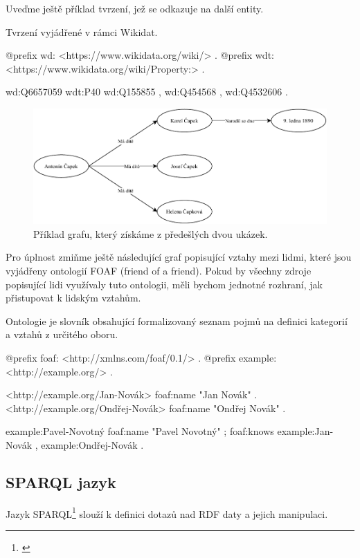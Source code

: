 Uveďme ještě příklad tvrzení, jež se odkazuje na další entity.
\begin{prikl}
Tvrzení  vyjádřené v rámci Wikidat.
\begin{code}
@prefix wd: <https://www.wikidata.org/wiki/> .
@prefix wdt: <https://www.wikidata.org/wiki/Property:> .

wd:Q6657059 wdt:P40 wd:Q155855 ,
                    wd:Q454568 ,
                    wd:Q4532606 .
\end{code}
\end{prikl}

\begin{figure}[h]
    \centering
    \includegraphics[width=\textwidth]{media/rdf.pdf}
    \caption{Příklad grafu, který získáme z předešlých dvou ukázek.}
\end{figure}

Pro úplnost zmiňme ještě následující graf popisující vztahy mezi lidmi, které jsou vyjádřeny ontologií FOAF (friend of a friend). Pokud by všechny zdroje popisující lidi využívaly tuto ontologii, měli bychom jednotné rozhraní, jak přistupovat k lidským vztahům.

Ontologie je slovník obsahující formalizovaný seznam pojmů na definici kategorií a vztahů z určitého oboru.

\begin{code}
@prefix foaf: <http://xmlns.com/foaf/0.1/> .
@prefix example: <http://example.org/> .

<http://example.org/Jan-Novák> foaf:name "Jan Novák" .
<http://example.org/Ondřej-Novák> foaf:name "Ondřej Novák" .

example:Pavel-Novotný foaf:name "Pavel Novotný" ;
                      foaf:knows example:Jan-Novák ,
                                 example:Ondřej-Novák .
\end{code}

\subsection{SPARQL jazyk}
Jazyk SPARQL\footnote{\citet{Seaborne:13:SQL}} slouží k definici dotazů nad RDF daty a jejich manipulaci.

